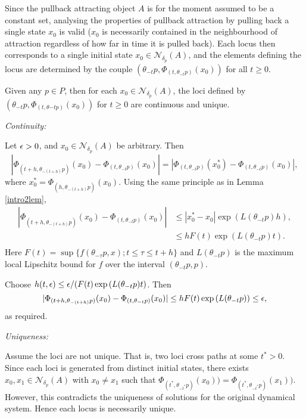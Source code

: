 Since the pullback attracting object $A$ is for the moment assumed to be a
constant set, analysing the properties of pullback attraction by pulling back a
single state $x_0$ is valid ($x_0$ is necessarily contained in the neighbourhood
of attraction regardless of how far in time it is pulled back). Each locus then
corresponds to a single initial state $x_0 \in \mathcal{N}_{\delta_p}(A)$, and
the elements defining the locus are determined by the couple $(\theta_{-t}p,
\Phi_{(t,\theta_{-t}p)}(x_0))$ for all $t \geq 0$.

\begin{lemma}
Given any $p \in P$, then for each $x_0 \in \mathcal{N}_{\delta_p}(A)$, the
loci defined by $(\theta_{-t}p, \Phi_{(t, \theta{-t}p)}(x_0))$ for
$t \geq 0$ are continuous and unique.
\end{lemma}
\begin{prf}
  {\em Continuity:}

Let $\epsilon > 0$, and $x_0 \in \mathcal{N}_{\delta_p}(A)$ be arbitrary.
Then
\[ |\Phi_{(t + h, \theta_{-(t+h)}p)}(x_0) - \Phi_{(t,\theta_{-t}p)}(x_0)| =
         |\Phi_{(t,\theta_{-t}p)}(x_0^*) - \Phi_{(t,\theta_{-t}p)}(x_0)|, \]
where $x_0^* = \Phi_{(h, \theta_{-(t+h)}p)}(x_0)$. Using
the same principle as in Lemma \ref{intro2lem},
\begin{align*}
  |\Phi_{(t + h,\theta_{-(t+h)}p)}(x_0) - \Phi_{(t, \theta_{-t}p)}(x_0)| &\leq
         |x_0^*-x_0| \exp\left( L(\theta_{-t} p)h\right), \\
  &\leq h F(t) \exp\left( L(\theta_{-t} p)t \right). \\
\end{align*}
Here $F(t) = \sup \{ f(\theta_{-\tau}p, x) ; t \leq \tau \leq t+h
\}$ and $L(\theta_{-t}p)$ is the maximum local Lipschitz bound for
$f$ over the interval $(\theta_{-t}p, p)$.

Choose $h(t, \epsilon) \leq \epsilon / ( F(t) \exp\left( L(\theta_{-t} p)t
\right)$. Then
\[ |\Phi_{(t + h, \theta_{-(t+h)}p)}(x_0) - \Phi_{(t,\theta_{-t}p)}(x_0)| \leq
  h F(t) \exp\left( L(\theta_{-t} p) \right) \leq \epsilon, \]
as required.

{\em Uniqueness: }

Assume the loci are not unique. That is, two loci cross paths at
some $t^*>0$. Since each loci is generated from distinct initial
states, there exists $x_0, x_1 \in \mathcal{N}_{\delta_p}(A)$ with
$x_0 \neq x_1$ such that $\Phi_{(t^*,\theta_{-t^*}p)}(x_0)) =
\Phi_{(t^*, \theta_{-t^*}p)}(x_1))$. However, this contradicts the
uniqueness of solutions for the original dynamical system. Hence
each locus is necessarily unique.
\end{prf}

